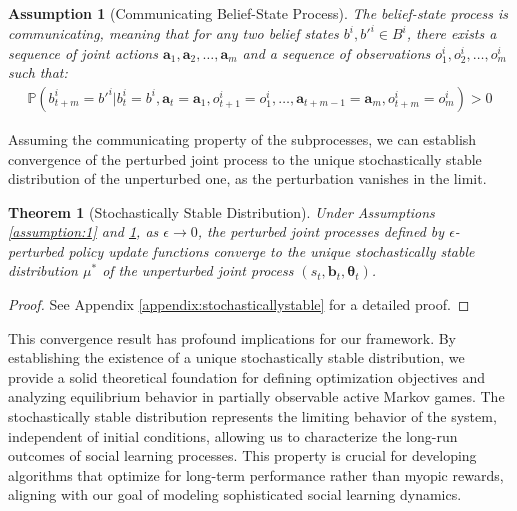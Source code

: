 \documentclass[a4paper,12pt]{report}
\newtheorem{theorem}{Theorem}
\newtheorem{assumption}{Assumption}
\begin{document}
\begin{assumption}[Communicating Belief-State Process]\label{assumption:2}
    The belief-state process is communicating, meaning that for any two belief states $b^i, b'^i \in B^i$, there exists a sequence of joint actions $\boldsymbol{a}_1, \boldsymbol{a}_2, \ldots, \boldsymbol{a}_m$ and a sequence of observations $o^i_1, o^i_2, \ldots, o^i_m$ such that:
    \begin{align}
        \mathbb{P}(b^i_{t+m} = b'^i | b^i_t = b^i, \boldsymbol{a}_t = \boldsymbol{a}_1, o^i_{t+1} = o^i_1, \ldots, \boldsymbol{a}_{t+m-1} = \boldsymbol{a}_m, o^i_{t+m} = o^i_m) > 0
    \end{align}
\end{assumption}
Assuming the communicating property of the subprocesses, we can establish convergence of the perturbed joint process to the unique stochastically stable distribution of the unperturbed one, as the perturbation vanishes in the limit.
\begin{theorem}[Stochastically Stable Distribution]
    Under Assumptions \ref{assumption:1} and \ref{assumption:2}, as $\epsilon \to 0$, the perturbed joint processes defined by $\epsilon$-perturbed policy update functions converge to the unique stochastically stable distribution $\mu^*$ of the unperturbed joint process $(s_t, \boldsymbol{b}_t, \boldsymbol{\theta}_t)$.
\end{theorem}

\begin{proof}
    See Appendix \ref{appendix:stochasticallystable} for a detailed proof.
\end{proof}
This convergence result has profound implications for our framework. By establishing the existence of a unique stochastically stable distribution, we provide a solid theoretical foundation for defining optimization objectives and analyzing equilibrium behavior in partially observable active Markov games. The stochastically stable distribution represents the limiting behavior of the system, independent of initial conditions, allowing us to characterize the long-run outcomes of social learning processes. This property is crucial for developing algorithms that optimize for long-term performance rather than myopic rewards, aligning with our goal of modeling sophisticated social learning dynamics.
\end{document}
